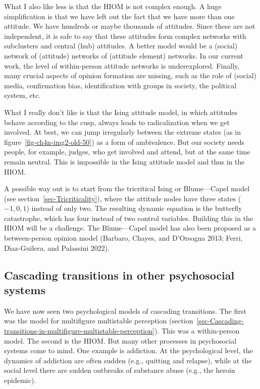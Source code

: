 \documentclass[
  a4paper,
  DIV=11,
  numbers=noendperiod,
  oneside]{scrreprt}
\begin{document}
What I also like less is that the HIOM is not complex enough. A huge
simplification is that we have left out the fact that we have more than
one attitude. We have hundreds or maybe thousands of attitudes. Since
these are not independent, it is safe to say that these attitudes form
complex networks with subclusters and central (hub) attitudes. A better
model would be a (social) network of (attitude) networks of (attitude
element) networks. In our current work, the level of within-person
attitude networks is underexplored. Finally, many crucial aspects of
opinion formation are missing, such as the role of (social) media,
confirmation bias, identification with groups in society, the political
system, etc.

What I really don't like is that the Ising attitude model, in which
attitudes behave according to the cusp, always leads to radicalization
when we get involved. At best, we can jump irregularly between the
extreme states (as in figure~\ref{fig-ch4n-img2-old-50}) as a form of
ambivalence. But our society needs people, for example, judges, who get
involved and attend, but at the same time remain neutral. This is
impossible in the Ising attitude model and thus in the HIOM.

A possible way out is to start from the tricritical Ising or
Blume---Capel model (see section~\ref{sec-Tricriticality}), where the
attitude nodes have three states (\(-1, 0, 1\)) instead of only two. The
resulting dynamic equation is the butterfly catastrophe, which has four
instead of two control variables. Building this in the HIOM will be a
challenge. The Blume---Capel model has also been proposed as a
between-person opinion model (Barbaro, Chayes, and D'Orsogna 2013;
Ferri, Dı́az-Guilera, and Palassini 2022).

\subsection{Cascading transitions in other psychosocial
systems}\label{sec-Cascading-transitions-in-other-psychosocial-systems}

We have now seen two psychological models of cascading transitions. The
first was the model for multifigure multistable perception
(section~\ref{sec-Cascading-transitions-in-multifigure-multistable-perception}).
This was a within-person model. The second is the HIOM. But many other
processes in psychosocial systems come to mind. One example is
addiction. At the psychological level, the dynamics of addiction are
often sudden (e.g., quitting and relapse), while at the social level
there are sudden outbreaks of substance abuse (e.g., the heroin
epidemic).
\end{document}
